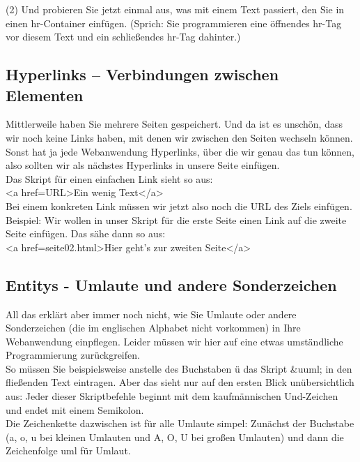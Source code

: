 (2)	Und probieren Sie jetzt einmal aus, was mit einem Text passiert, den Sie in einen hr-Container einfügen. (Sprich: Sie programmieren eine öffnendes hr-Tag vor diesem Text und ein schließendes hr-Tag dahinter.)

\subsection{Hyperlinks – Verbindungen zwischen Elementen}

Mittlerweile haben Sie mehrere Seiten gespeichert. Und da ist es unschön, dass wir noch keine Links haben, mit denen wir zwischen den Seiten wechseln können. Sonst hat ja jede Webanwendung Hyperlinks, über die wir genau das tun können, also sollten wir als nächstes Hyperlinks in unsere Seite einfügen.\\

Das Skript für einen einfachen Link sieht so aus:\\

<a href=URL>Ein wenig Text</a>\\

Bei einem konkreten Link müssen wir jetzt also noch die URL des Ziels einfügen.
Beispiel: Wir wollen in unser Skript für die erste Seite einen Link auf die zweite Seite einfügen. Das sähe dann so aus:\\

<a href=seite02.html>Hier geht’s zur zweiten Seite</a>

\subsection{Entitys - Umlaute und andere Sonderzeichen}

All das erklärt aber immer noch nicht, wie Sie Umlaute oder andere Sonderzeichen (die im englischen Alphabet nicht vorkommen) in Ihre Webanwendung einpflegen. Leider müssen wir hier auf eine etwas umständliche Programmierung zurückgreifen.\\

So müssen Sie beispielsweise anstelle des Buchstaben ü das Skript \&uuml; in den fließenden Text eintragen. Aber das sieht nur auf den ersten Blick unübersichtlich aus: Jeder dieser Skriptbefehle beginnt mit dem kaufmännischen Und-Zeichen und endet mit einem Semikolon.\\

Die Zeichenkette dazwischen ist für alle Umlaute simpel: Zunächst der Buchstabe (a, o, u bei kleinen Umlauten und A, O, U bei großen Umlauten) und dann die Zeichenfolge uml für Umlaut.\\

